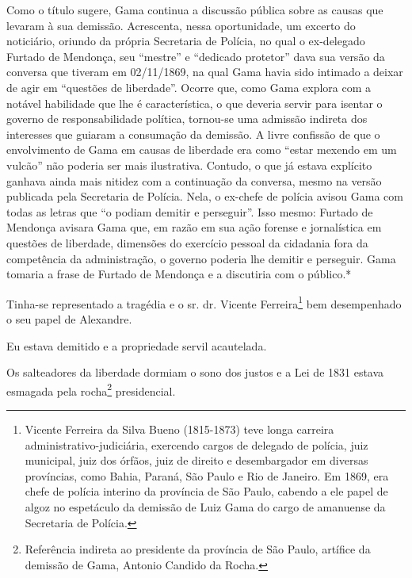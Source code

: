 \begin{didascalia}
Como o título sugere, Gama continua a discussão pública sobre as causas
que levaram à sua demissão. Acrescenta, nessa oportunidade, um excerto
do noticiário, oriundo da própria Secretaria de Polícia, no qual o
ex-delegado Furtado de Mendonça, seu ``mestre'' e ``dedicado protetor'' dava
sua versão da conversa que tiveram em 02/11/1869, na qual Gama havia
sido intimado a deixar de agir em ``questões de liberdade''. Ocorre que,
como Gama explora com a notável habilidade que lhe é característica, o
que deveria servir para isentar o governo de responsabilidade política,
tornou-se uma admissão indireta dos interesses que guiaram a consumação
da demissão. A livre confissão de que o envolvimento de Gama em causas
de liberdade era como ``estar mexendo em um vulcão'' não poderia ser mais
ilustrativa. Contudo, o que já estava explícito ganhava ainda mais
nitidez com a continuação da conversa, mesmo na versão publicada pela
Secretaria de Polícia. Nela, o ex-chefe de polícia avisou Gama com todas
as letras que ``o podiam demitir e perseguir''. Isso mesmo: Furtado de
Mendonça avisara Gama que, em razão em sua ação forense e jornalística
em questões de liberdade, dimensões do exercício pessoal da cidadania
fora da competência da administração, o governo poderia lhe demitir e
perseguir. Gama tomaria a frase de Furtado de Mendonça e a discutiria
com o público.*
\end{didascalia}

\asterisc{}

Tinha-se representado a tragédia e o sr. dr. Vicente Ferreira\footnote{
  Vicente Ferreira da Silva Bueno (1815-1873) teve longa carreira
  administrativo-judiciária, exercendo cargos de delegado de polícia,
  juiz municipal, juiz dos órfãos, juiz de direito e desembargador em
  diversas províncias, como Bahia, Paraná, São Paulo e Rio de Janeiro.
  Em 1869, era chefe de polícia interino da província de São Paulo,
  cabendo a ele papel de algoz no espetáculo da demissão de Luiz Gama do
  cargo de amanuense da Secretaria de Polícia.} bem desempenhado o seu
papel de Alexandre.

Eu estava demitido e a propriedade servil acautelada.

Os salteadores da liberdade dormiam o sono dos justos e a Lei de 1831
estava esmagada pela rocha\footnote{Referência indireta ao presidente
  da província de São Paulo, artífice da demissão de Gama, Antonio
  Candido da Rocha.} presidencial.

